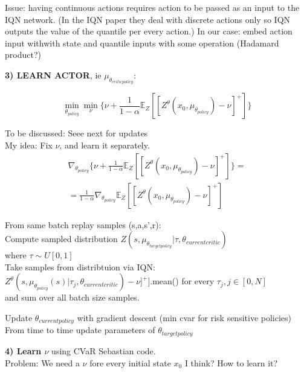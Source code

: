 Issue: having continuous actions requires action to be passed as an input to the IQN network.
(In the IQN paper they deal with discrete actions only so IQN outputs the value of the quantile per every action.)
In our case: embed action input withwith state and quantile inputs with some operation (Hadamard product?)
\newline




\textbf{3) LEARN ACTOR}, ie $\mu_{\theta_{criticpolicy}}$:

 \begin{equation}
    \underset{\theta_{policy}} \min  \underset{\nu} \min \big\{\nu + \frac{1}{1-\alpha} \mathbb E_Z[[Z^\theta (x_0,\mu_{\theta_{policy}})- \nu]^+]\big\}
 \end{equation}

To be discussed: Seee next for updates\\
My idea:
Fix $\nu$, and learn it separately.\\

\begin{eqnarray}
    \nabla_{\theta_{policy}} \big\{\nu + \frac{1}{1-\alpha} \mathbb E_Z[[Z^\theta (x_0,\mu_{\theta_{policy}})- \nu]^+]\big\} =\\
    = \frac{1}{1-\alpha} \nabla_{\theta_{policy}} \mathbb E_Z[[Z^\theta (x_0,\mu_{\theta_{policy}})- \nu]^+]
\end{eqnarray}

From same batch replay samples (s,a,s',r):\\
Compute sampled distribution $Z(s,\mu_{\theta_{targetpolicy}} | \tau, \theta_{currentcritic})$ \\
where $\tau  \sim U[0,1]$\\
Take samples from distribtuion via IQN:\\

$Z^\theta (s,\mu_{\theta_{policy}} (s) |\tau_j, \theta_{currentcritic})- \nu]^+]$.mean() for every $\tau_j, j \in [0,N]$\\

and sum over all batch size samples.


Update $\theta_{currentpolicy}$ with gradient descent (min cvar for risk sensitive policies)\\
From time to time update parameters of $\theta_{targetpolicy}$\newline


\textbf{4) Learn $\nu$} using CVaR Sebastian code.\\
\color{red} {Problem: We need a $\nu$ fore every initial state $x_0$ I think? How to learn it? }


